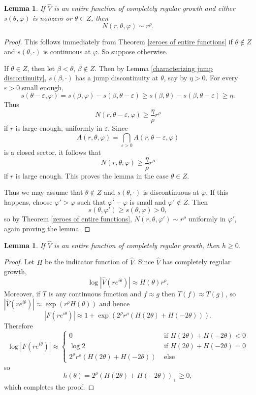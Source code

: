 \documentclass[reqno,12pt,letterpaper]{amsart}
\newtheorem{lemma}[theorem]{Lemma}
\theoremstyle{definition}
\begin{document}
\begin{lemma}
\label{zeroes of entire functions with jump discontinuity}
If $\widehat V$ is an entire function of completely regular growth and either $s(\theta, \varphi)$ is nonzero or $\theta \in Z$, then
$$N(r, \theta, \varphi) \sim r^\rho.$$
\end{lemma}
\begin{proof}
This follows immediately from Theorem \ref{zeroes of entire functions} if $\theta \notin Z$ and $s(\theta, \cdot)$ is continuous at $\varphi$.
So suppose otherwise.

If $\theta \in Z$, then let $\beta < \theta$, $\beta \notin Z$.
Then by Lemma \ref{characterizing jump discontinuity}, $s(\beta, \cdot)$ has a jump discontinuity at $\theta$, say by $\eta > 0$.
For every $\varepsilon > 0$ small enough,
$$s(\theta - \varepsilon, \varphi) = s(\beta, \varphi) - s(\beta, \theta - \varepsilon) \geq s(\beta, \theta) - s(\beta, \theta - \varepsilon) \geq \eta.$$
Thus
$$N(r, \theta - \varepsilon, \varphi) \geq \frac{\eta}{\rho}r^\rho$$
if $r$ is large enough, uniformly in $\varepsilon$. Since
$$A(r, \theta, \varphi) = \bigcap_{\varepsilon > 0} A(r, \theta - \varepsilon, \varphi)$$
is a closed sector, it follows that
$$N(r, \theta, \varphi) \geq \frac{\eta}{\rho}r^\rho$$
if $r$ is large enough. This proves the lemma in the case $\theta \in Z$.

Thus we may assume that $\theta \notin Z$ and $s(\theta, \cdot)$ is discontinuous at $\varphi$.
If this happens, choose $\varphi' > \varphi$ such that $\varphi' - \varphi$ is small and $\varphi' \notin Z$. Then
$$s(\theta, \varphi') \geq s(\theta, \varphi) > 0,$$
so by Theorem \ref{zeroes of entire functions}, $N(r, \theta, \varphi') \sim r^\rho$ uniformly in $\varphi'$, again proving the lemma.
\end{proof}

\begin{lemma}
\label{no trigonometric indicators}
If $\widehat V$ is an entire function of completely regular growth, then $h \geq 0$.
\end{lemma}
\begin{proof}
Let $H$ be the indicator function of $\widehat V$.
Since $\widehat V$ has completely regular growth,
$$\log |\widehat V(re^{i\theta})| \approx H(\theta)r^\rho.$$
Moreover, if $T$ is any continuous function and $f \approx g$ then $T(f) \approx T(g)$, so $|\widehat V(re^{i\theta})| \approx \exp(r^\rho H(\theta))$ and hence
$$|F(re^{i\theta})| \approx 1 + \exp(2^\rho r^\rho(H(2\theta) + H(-2\theta))).$$
Therefore
$$\log |F(re^{i\theta})| \approx \begin{cases}
0 &\text{ if $H(2\theta) + H(-2\theta) < 0$}\\
\log 2 &\text{ if $H(2\theta) + H(-2\theta) = 0$}\\
2^\rho r^\rho (H(2\theta) + H(-2\theta)) &\text{ else}
\end{cases}$$
so
$$h(\theta) = 2^\rho (H(2\theta) + H(-2\theta))_+ \geq 0,$$
which completes the proof.
\end{proof}
\end{document}
